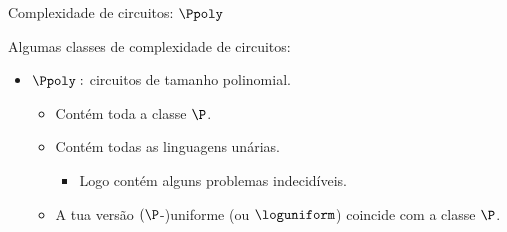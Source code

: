 \documentclass[landscape, 9pt]{beamer}
\begin{document}
\begin{frame} {Complexidade de circuitos: $\Ppoly$}

Algumas classes de complexidade de circuitos:

\begin{itemize}

	\item $\Ppoly:$ circuitos de tamanho polinomial.
	
	\begin{itemize}
	
		\item Contém toda a classe $\P$.
		
		\item Contém todas as linguagens unárias.
		
		\begin{itemize}
		
			\item Logo contém alguns problemas indecidíveis.
	
		\end{itemize}
		
		\item A tua versão $(\P$-)uniforme (ou $\loguniform$) coincide com a classe $\P$.
	
	\end{itemize}

\end{itemize}

\end{frame}

\end{document}
